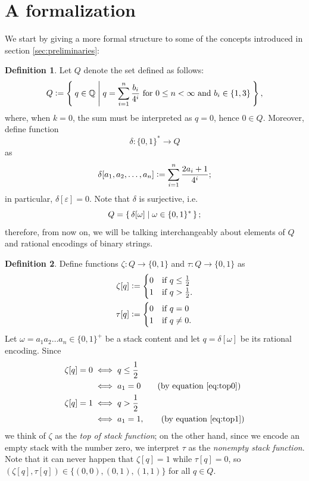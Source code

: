 \documentclass{book}
\newcommand{\defeq}{\vcentcolon=}
\newcommand{\Q}{\mathbb{Q}}
\theoremstyle{definition}
\newtheorem{definition}{Definition}[chapter]
\theoremstyle{plain}
\theoremstyle{plain}
\theoremstyle{remark}
\theoremstyle{plain}
\begin{document}
	\section{A formalization}
	We start by giving a more formal structure to some of the concepts introduced in section \ref{sec:preliminaries}:
	
	\begin{definition} 
		Let $Q$ denote the set defined as follows: 
		$$
			Q\defeq\Set{ q\in\Q | 
						 q=\sum_{i=1}^{n}\frac{b_i}{4^i} 
						 \text{ for }0\leq n<\infty\text{ and }b_i\in\{1,3\} },
		$$
		where, when $k=0$, the sum must be interpreted as $q=0$, hence $0\in Q$. Moreover, define function $$\delta:\{0,1\}^*\to Q$$ as
		$$
			\delta[a_1,a_2,\dots,a_n]\defeq\sum_{i=1}^{n}\frac{2a_i+1}{4^i};
		$$ 
		in particular, $\delta[\varepsilon]=0$. Note that $\delta$ is surjective, i.e. $$Q=\set{\delta[\omega] | \omega\in\{0,1\}^*};$$ therefore, from now on, we will be talking interchangeably about elements of $Q$ and rational encodings of binary strings.
	\end{definition}
	
	\begin{definition} \label{def:topAndNonempty}
		Define functions $\zeta:Q\to\{0,1\}$ and $\tau:Q\to\{0,1\}$ as
		\begin{align} \label{eq:topAndNonempty}
			\begin{split}
				\zeta[q] &\defeq 
					\begin{cases}
						0 & \text{if } q\leq\frac{1}{2} \\
						1 & \text{if } q>\frac{1}{2}.
					\end{cases}
				\\
				\tau[q] &\defeq
					\begin{cases}
						0 & \text{if } q=0 \\
						1 & \text{if } q\neq 0.
					\end{cases}
			\end{split} 
		\end{align}
		Let $\omega=a_1a_2\dots a_n\in\{0,1\}^+$ be a stack content and let $q=\delta[\omega]$ be its rational encoding. Since
		\begin{align*}
			\zeta[q]=0 &\iff q\leq\frac{1}{2} \\
					   &\iff a_1=0 \tag{by equation \ref{eq:top0}}\\
			\zeta[q]=1 &\iff q>\frac{1}{2} \\
					   &\iff a_1=1, \tag{by equation \ref{eq:top1}}
		\end{align*}
		we think of $\zeta$ as the \emph{top of stack function}; on the other hand, since we encode an empty stack with the number zero, we interpret $\tau$ as the \emph{nonempty stack function}. Note that it can never happen that $\zeta[q]=1$ while $\tau[q]=0$, so $(\zeta[q],\tau[q])\in\{(0,0),(0,1),(1,1)\}$ for all $q\in Q$.
	\end{definition}
	
\end{document}
